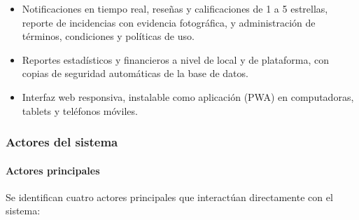 \begin{itemize}
    \item Notificaciones en tiempo real, reseñas y calificaciones de 1 a 5 estrellas, reporte de incidencias con evidencia fotográfica, y administración de términos, condiciones y políticas de uso.
    \item Reportes estadísticos y financieros a nivel de local y de plataforma, con copias de seguridad automáticas de la base de datos.
    \item Interfaz web responsiva, instalable como aplicación (PWA) en computadoras, tablets y teléfonos móviles.
\end{itemize}

\newpage\subsubsection{Actores del sistema}

\paragraph{Actores principales} Se identifican cuatro actores principales que interactúan directamente con el sistema:

